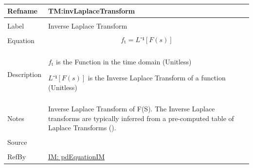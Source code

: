 \documentclass[12pt]{article}
\begin{document}
\noindent
\begin{minipage}{\textwidth}
\begin{tabular}{>{\raggedright}p{}>{\raggedright\arraybackslash}p{}}
\toprule \textbf{Refname} & \textbf{TM:invLaplaceTransform}
\label{TM:invLaplaceTransform}
\\ \midrule \\
Label & Inverse Laplace Transform
        
\\ \midrule \\
Equation & \begin{displaymath}
           {f_{\text{t}}}=L⁻¹[F(s)]
           \end{displaymath}
\\ \midrule \\
Description & \begin{symbDescription}
              \item{${f_{\text{t}}}$ is the Function in the time domain (Unitless)}
              \item{$L⁻¹[F(s)]$ is the Inverse Laplace Transform of a function (Unitless)}
              \end{symbDescription}
\\ \midrule \\
Notes & Inverse Laplace Transform of F(S). The Inverse Laplace transforms are typically inferred from a pre-computed table of Laplace Transforms (\cite{laplaceWiki}).
        
\\ \midrule \\
Source & \cite{laplaceWiki}
         
\\ \midrule \\
RefBy & \hyperref[IM:pdEquationIM]{IM: pdEquationIM}
        
\\ \bottomrule
\end{tabular}
\end{minipage}
\vspace{\baselineskip}
\noindent
\end{document}
